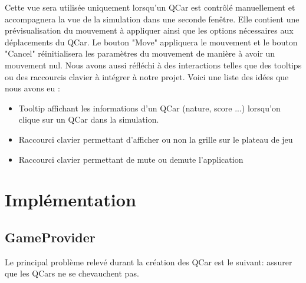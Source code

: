 \documentclass[a4paper, 12pt]{article}
\begin{document}
Cette vue sera utilisée uniquement lorsqu'un QCar est contrôlé manuellement et accompagnera la vue de la simulation dans une seconde fenêtre. Elle contient une prévisualisation du mouvement à appliquer ainsi que les options nécessaires aux déplacements du QCar. Le bouton "Move" appliquera le mouvement et le bouton "Cancel" réinitialisera les paramètres du mouvement de manière à avoir un mouvement nul.
Nous avons aussi réfléchi à des interactions telles que des tooltips ou des raccourcis clavier à intégrer à notre projet. Voici une liste des idées que nous avons eu :
\begin{itemize}
  \item Tooltip affichant les informations d'un QCar (nature, score ...) lorsqu'on clique sur un QCar dans la simulation.
  \item Raccourci clavier permettant d'afficher ou non la grille sur le plateau de jeu
  \item Raccourci clavier permettant de mute ou demute l'application
\end{itemize}

\section{Implémentation}
\subsection{GameProvider}
Le principal problème relevé durant la création des QCar est le suivant: assurer que les QCars ne se chevauchent pas.
\end{document}
